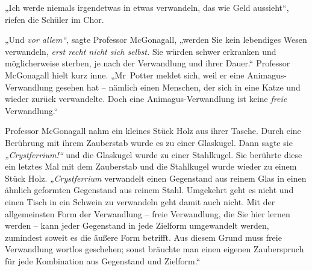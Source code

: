 „Ich werde niemals irgendetwas in etwas verwandeln, das wie Geld aussieht“, riefen die Schüler im Chor. 

„Und \emph{vor allem“,} sagte Professor McGonagall, „werden Sie kein lebendiges Wesen verwandeln, \emph{erst recht nicht sich selbst.} Sie würden schwer erkranken und möglicherweise sterben, je nach der Verwandlung und ihrer Dauer.“ Professor McGonagall hielt kurz inne. „Mr~Potter meldet sich, weil er eine Animagus-Verwandlung gesehen hat – nämlich einen Menschen, der sich in eine Katze und wieder zurück verwandelte. Doch eine Animagus-Verwandlung ist keine \emph{freie} Verwandlung.“ 

Professor McGonagall nahm ein kleines Stück Holz aus ihrer Tasche. Durch eine Berührung mit ihrem Zauberstab wurde es zu einer Glaskugel. Dann sagte sie \emph{„Crystferrium!“} und die Glaskugel wurde zu einer Stahlkugel. Sie berührte diese ein letztes Mal mit dem Zauberstab und die Stahlkugel wurde wieder zu einem Stück Holz. \emph{„Crystferrium} verwandelt einen Gegenstand aus reinem Glas in einen ähnlich geformten Gegenstand aus reinem Stahl. Umgekehrt geht es nicht und einen Tisch in ein Schwein zu verwandeln geht damit auch nicht. Mit der allgemeinsten Form der Verwandlung – freie Verwandlung, die Sie hier lernen werden – kann jeder Gegenstand in jede Zielform umgewandelt werden, zumindest soweit es die äußere Form betrifft. Aus diesem Grund muss freie Verwandlung wortlos geschehen; sonst bräuchte man einen eigenen Zauberspruch für jede Kombination aus Gegenstand und Zielform.“

